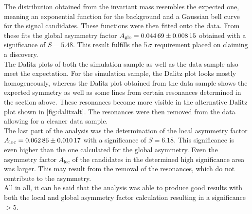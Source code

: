 The distribution obtained from the invariant mass resembles the expected one, 
meaning an exponential function for the background and a Gaussian bell curve 
for the signal candidates. These functions were then fitted onto the data. 
From these fits the global asymmetry factor $A_\mathrm{glo} = \num{0.04469\pm0.00815}$ 
obtained with a significance of $S = 5.48$. This result fulfills the 5\,$\sigma$ 
requirement placed on claiming a discovery.\\

The Dalitz plots of both the simulation sample as well as the data sample 
also meet the expectation. For the simulation sample, the Dalitz plot looks 
mostly homogeneously, whereas the Dalitz plot obtained from the data sample 
shows the expected symmetry as well as some lines from certain resonances 
determined in the section above. These resonances become more visible in the 
alternative Dalitz plot shown in \autoref{fig:dalitzalt}. 
The resonances were then removed from the data allowing for a cleaner data sample.\\

The last part of the analysis was the determination of the local asymmetry factor 
$A_\mathrm{loc} = \num{0.06286\pm0.01017}$ with a significance of $S = 6.18$. 
This significance is even higher than the one calculated for the global asymmetry. 
Even the asymmetry factor $A_\mathrm{loc}$ of the candidates in the determined high 
significance area was larger. This may result from the removal of the resonances, 
which do not contribute to the asymmetry.\\

All in all, it can be said that the analysis was able to produce good results 
with both the local and global asymmetry factor calculation resulting in a significance $>5$.


